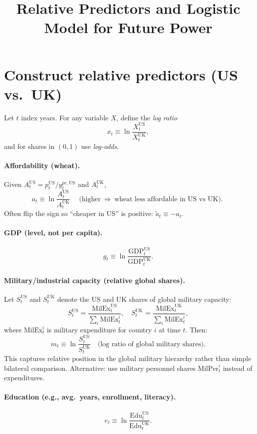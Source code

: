 \documentclass[11pt]{article}
\title{Relative Predictors and Logistic Model for Future Power}
\date{}
\newcommand{\US}{\mathrm{US}}
\newcommand{\UK}{\mathrm{UK}}
\begin{document}
\maketitle
\vspace{-1.5em}

\section{Construct relative predictors (US vs.\ UK)}

Let $t$ index years. For any variable $X$, define the \emph{log ratio}
\[
x_t \equiv \ln\!\frac{X_t^{\US}}{X_t^{\UK}},
\]
and for shares in $(0,1)$ use \emph{log-odds}.

\paragraph{Affordability (wheat).}
Given $A_t^{\US}=p_t^{\US}/y^{pc,\US}_t$ and $A_t^{\UK}$,
\[
a_t \equiv \ln\!\frac{A_t^{\US}}{A_t^{\UK}}
\quad\text{(higher $\,\Rightarrow\,$ wheat less affordable in US vs UK).}
\]
Often flip the sign so ``cheaper in US'' is positive: $\tilde a_t \equiv -a_t$.

\paragraph{GDP (level, not per capita).}
\[
g_t \equiv \ln\!\frac{\mathrm{GDP}^{\US}_t}{\mathrm{GDP}^{\UK}_t}.
\]

\paragraph{Military/industrial capacity (relative global shares).}
Let $S^{\US}_t$ and $S^{\UK}_t$ denote the US and UK shares of global military capacity:
\[
S^{\US}_t = \frac{\mathrm{MilEx}^{\US}_t}{\sum_{i} \mathrm{MilEx}^i_t}, \quad
S^{\UK}_t = \frac{\mathrm{MilEx}^{\UK}_t}{\sum_{i} \mathrm{MilEx}^i_t},
\]
where $\mathrm{MilEx}^i_t$ is military expenditure for country $i$ at time $t$. Then:
\[
m_t \equiv \ln\!\frac{S^{\US}_t}{S^{\UK}_t}
\quad\text{(log ratio of global military shares).}
\]
This captures relative position in the global military hierarchy rather than simple bilateral comparison. Alternative: use military personnel shares $\mathrm{MilPer}^i_t$ instead of expenditures.

\paragraph{Education (e.g., avg.\ years, enrollment, literacy).}
\[
e_t \equiv \ln\!\frac{\mathrm{Edu}^{\US}_t}{\mathrm{Edu}^{\UK}_t}.
\]
\end{document}
